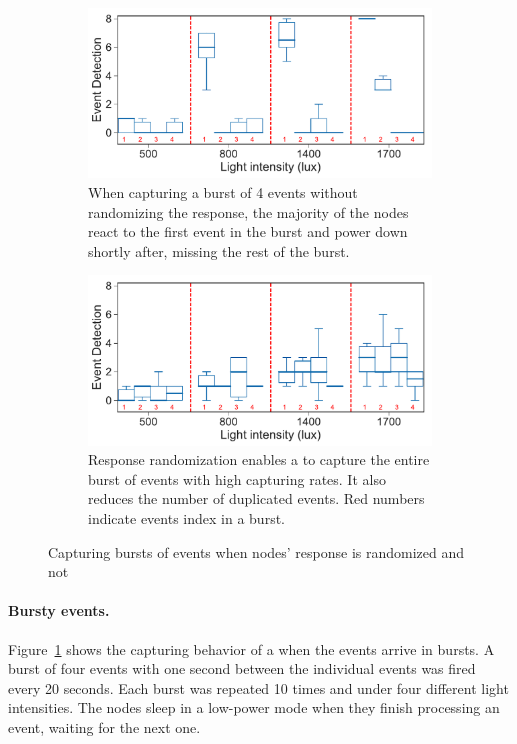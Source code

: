 \begin{figure}
\begin{subfigure}{.49\columnwidth}
    \includegraphics[width=\columnwidth]{figures/events_burst_problem}
	\caption{When capturing a burst of 4 events without randomizing the response, the majority of the nodes react to the first event in the burst and power down shortly after, missing the rest of the burst.}
    \label{fig:events_burst_problem}
\end{subfigure}\hfill
\begin{subfigure}{.49\columnwidth}
	\centering
     \includegraphics[width=\columnwidth]{figures/events_burst_rand}
    \caption{Response randomization enables a \cis to capture the entire burst of events with high capturing rates. It also reduces the number of duplicated events. Red numbers indicate events index in a burst.}
    \label{fig:events_burst_rand}
\end{subfigure}
\caption{Capturing bursts of events when \cis nodes' response is randomized and not}
\end{figure}

\paragraph{Bursty events.}
Figure~\ref{fig:events_burst_problem} shows the capturing behavior of a \cis when the events arrive in bursts. A burst of four events with one second between the individual events was fired every 20 seconds. Each burst was repeated 10 times and under four different light intensities. The nodes sleep in a low-power mode when they finish processing an event, waiting for the next one. 

